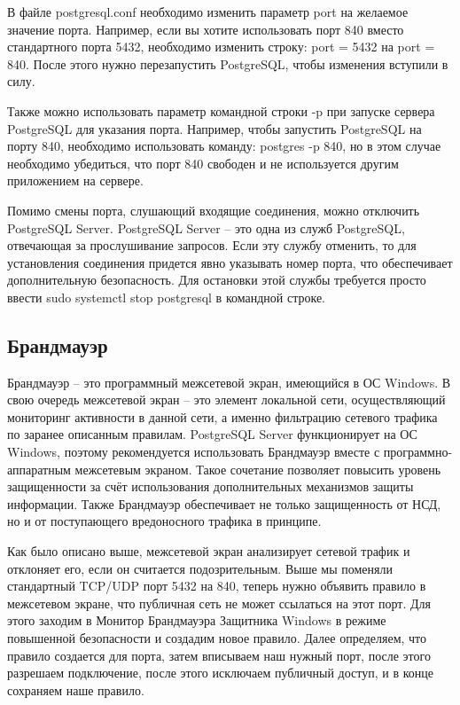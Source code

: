 В файле postgresql.conf необходимо изменить параметр port на желаемое значение порта. Например, если вы хотите использовать порт 840 вместо стандартного порта 5432, необходимо изменить строку: port = 5432 на port = 840. После этого нужно перезапустить PostgreSQL, чтобы изменения вступили в силу.

Также можно использовать параметр командной строки -p при запуске сервера PostgreSQL для указания порта. Например, чтобы запустить PostgreSQL на порту 840, необходимо использовать команду: postgres -p 840, но в этом случае необходимо убедиться, что порт 840 свободен и не используется другим приложением на сервере.

Помимо смены порта, слушающий входящие соединения, можно отключить PostgreSQL Server. PostgreSQL Server – это одна из служб PostgreSQL, отвечающая за прослушивание запросов. Если эту службу отменить, то для установления соединения придется явно указывать номер порта, что обеспечивает дополнительную безопасность. Для остановки этой службы требуется просто ввести sudo systemctl stop postgresql в командной строке.



\subsection{Брандмауэр}

Брандмауэр – это программный межсетевой экран, имеющийся в ОС Windows. В свою очередь межсетевой экран – это элемент локальной сети, осуществляющий мониторинг активности в данной сети, а именно фильтрацию сетевого трафика по заранее описанным правилам. PostgreSQL Server функционирует на ОС Windows, поэтому рекомендуется использовать Брандмауэр вместе с программно-аппаратным межсетевым экраном. Такое сочетание позволяет повысить уровень защищенности за счёт использования дополнительных механизмов защиты информации. Также Брандмауэр обеспечивает не только защищенность от НСД, но и от поступающего вредоносного трафика в принципе.

Как было описано выше, межсетевой экран анализирует сетевой трафик и отклоняет его, если он считается подозрительным. Выше мы поменяли стандартный TCP/UDP порт 5432 на 840, теперь нужно объявить правило в межсетевом экране, что публичная сеть не может ссылаться на этот порт. Для этого заходим в Монитор Брандмауэра Защитника Windows в режиме повышенной безопасности и создадим новое правило. Далее определяем, что правило создается для порта, затем вписываем наш нужный порт, после этого разрешаем подключение, после этого исключаем публичный доступ, и в конце сохраняем наше правило.


